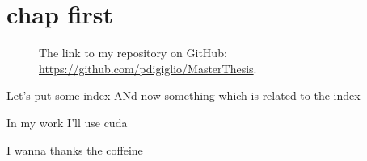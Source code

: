 \documentclass[
	10pt,
	twoside,
	openright,
]{scrbook}
\title{}
\subtitle{}
\author{
  
}
\date{}
\begin{document}
%
\frontmatter
{}
	\maketitle
	\thispagestyle{empty}

	\cleardoublepage
{}
	

	\cleardoublepage
{}
	

	\cleardoublepage
{}
	

	\cleardoublepage
{}
	\tableofcontents

%
\mainmatter
\chapter{chap first}
\lipsum


\begin{figure}
	\centering
\caption{The link to my repository on GitHub: \url{https://github.com/pdigiglio/MasterThesis}.}
\end{figure}


Let's put some index
ANd now something which is related to the index




In my work I'll use \gls{cuda}


I wanna thanks the coffeine


%
\backmatter
	\printnoidxglossaries

	\cleardoublepage
	\printindex

	\cleardoublepage
	\nocite{*}
	\printbibliography
\end{document}

